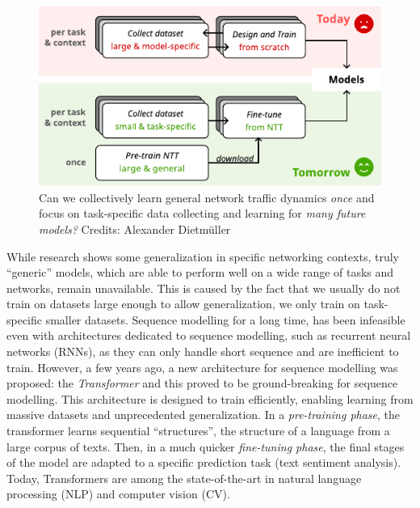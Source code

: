 \begin{figure}
    \centering
    \includegraphics[scale=1.3]{figures/vision}
    \caption{Can we collectively learn general network traffic dynamics \emph{once} and focus on task-specific data collecting and learning  for \emph{many future models?} Credits: Alexander Dietmüller}
    \label{fig:vision}
\end{figure}

While research shows some generalization in specific networking contexts\cite{jayDeepReinforcementLearning2019}, truly ``generic'' models, which are able to perform well on a wide range of tasks and networks, remain unavailable. This is caused by the fact that we usually do not train on datasets large enough to allow generalization, we only train on task-specific smaller datasets. Sequence modelling for a long time, has been infeasible even with architectures dedicated to sequence modelling, such as recurrent neural networks (RNNs), as they can only handle short sequence and are inefficient to train\cite{factor}. However, a few years ago, a new architecture for sequence modelling was proposed: the \emph{Transformer}\cite{vaswaniAttentionAllYou2017} and this proved to be ground-breaking for sequence modelling. This architecture is designed to train efficiently, enabling learning from massive datasets and unprecedented generalization. In a \emph{pre-training phase}, the transformer learns sequential ``structures'', \eg the structure of a language from a large corpus of texts. Then, in a much quicker \emph{fine-tuning phase}, the final stages of the model are adapted to a specific prediction task (\eg text sentiment analysis). Today, Transformers are among the state-of-the-art in natural language processing (NLP\cite{recentnlp}) and computer vision (CV\cite{cvsurvey}).

